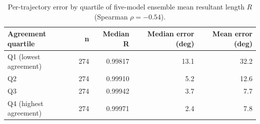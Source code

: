 \begin{table}[h!]
    \centering
    \caption{Per-trajectory error by quartile of five-model ensemble mean resultant length $R$ (Spearman $\rho=-0.54$).}
    \label{tab:calibration}
    \begin{tabular}{@{}lrrrr@{}}
        \toprule
        Agreement quartile & n & Median R & Median error (deg) & Mean error (deg) \\
        \midrule
        Q1 (lowest agreement) & 274 & 0.99817 & 13.1 & 32.2 \\
        Q2 & 274 & 0.99910 & 5.2 & 12.6 \\
        Q3 & 274 & 0.99942 & 3.7 & 7.7 \\
        Q4 (highest agreement) & 274 & 0.99971 & 2.4 & 7.8 \\
        \bottomrule
    \end{tabular}
\end{table}
